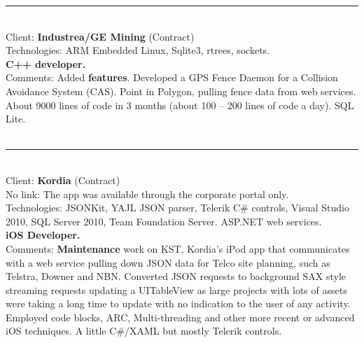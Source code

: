 \documentclass{article}
\begin{document}

\noindent\hfil\rule{0.5\textwidth}{.4pt}\hfil
\\

Client: 	\textbf  {Industrea/GE Mining} (Contract) \\
Technologies: 	ARM Embedded Linux, Sqlite3, rtrees, sockets. \\
\textbf{ C++ developer.  }\\
Comments:	Added {\bf features}. Developed a GPS Fence Daemon for a Collision Avoidance System (CAS). Point in Polygon, pulling fence data from web services. About 9000 lines of code in 3 months (about 100 – 200 lines of code a day).
	SQL Lite. \\
\\

\noindent\hfil\rule{0.5\textwidth}{.4pt}\hfil
\\


Client: 	\textbf  {Kordia} (Contract) \\
No link: The app was available through the corporate portal only. \\
Technologies: 	JSONKit, YAJL JSON parser, Telerik C\# controls, Visual Studio 2010, SQL Server 2010, Team Foundation Server. ASP.NET web services.\\
\textbf{ iOS Developer. }\\
Comments:	{\bf Maintenance} work on KST, Kordia's iPod app that communicates with a web service pulling down JSON data for Telco site planning, such as Telstra, Downer and NBN. Converted JSON requests to background SAX style streaming requests updating a UITableView as large projects with lots of assets were taking a long time to update with no indication to the user of any activity.
	Employed code blocks, ARC, Multi-threading and other more recent or advanced iOS techniques. A little C\#/XAML but mostly Telerik controls.  \\
\\
\end{document}
